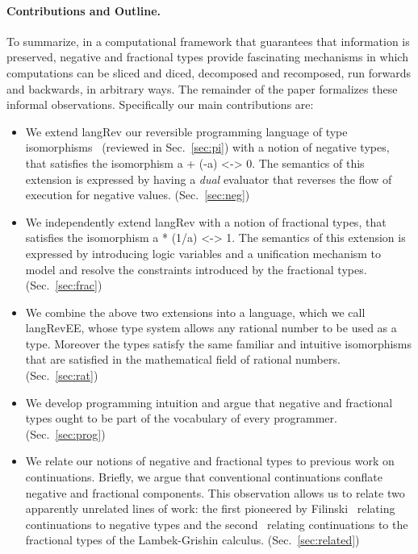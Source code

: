 \documentclass[preprint]{sigplanconf}
\begin{document}
\paragraph*{Contributions and Outline.} 
To summarize, in a computational framework that guarantees that information
is preserved, negative and fractional types provide fascinating mechanisms in
which computations can be sliced and diced, decomposed and recomposed, run
forwards and backwards, in arbitrary ways. The remainder of the paper
formalizes these informal observations. Specifically our main contributions
are:
\begin{itemize}
\item We extend {{langRev}} our reversible programming language of type
  isomorphisms~\cite{rc2011,infeffects} (reviewed in Sec.~\ref{sec:pi}) with a notion
  of negative types, that satisfies the isomorphism {{a + (-a) <-> 0}}. The
  semantics of this extension is expressed by having a \emph{dual} evaluator
  that reverses the flow of execution for negative
  values. (Sec.~\ref{sec:neg})
\item We independently extend {{langRev}} with a notion of fractional types,
  that satisfies the isomorphism {{a * (1/a) <-> 1}}. The semantics of this
  extension is expressed by introducing logic variables and a unification
  mechanism to model and resolve the constraints introduced by the fractional
  types. (Sec.~\ref{sec:frac})
\item We combine the above two extensions into a language, which we
  call {{langRevEE}}, whose type system allows any rational number to
  be used as a type. Moreover the types satisfy the same familiar and
  intuitive isomorphisms that are satisfied in the mathematical field
  of rational numbers. (Sec.~\ref{sec:rat})
\item We develop programming intuition and argue that negative and fractional
  types ought to be part of the vocabulary of every
  programmer. (Sec.~\ref{sec:prog})
\item We relate our notions of negative and fractional types to previous work
  on continuations. Briefly, we argue that conventional continuations
  conflate negative and fractional components. This observation allows us to
  relate two apparently unrelated lines of work: the first pioneered by
  Filinski~\cite{Filinski:1989:DCI:648332.755574} relating continuations to
  negative types and the second~\cite{Bernardi:2010:CSL:1749618.1749689}
  relating continuations to the fractional types of the Lambek-Grishin
  calculus. (Sec.~\ref{sec:related})
\end{itemize}
\end{document}
